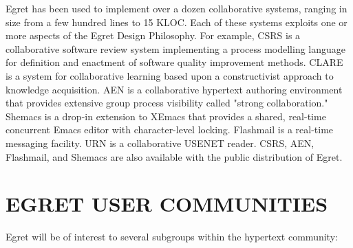 Egret has been used to implement over a dozen collaborative systems,
ranging in size from a few hundred lines to 15 KLOC.  Each of these systems
exploits one or more aspects of the Egret Design Philosophy. For example,
CSRS is a collaborative software review system implementing a process
modelling language for definition and enactment of software quality
improvement methods.  CLARE is a system for collaborative learning based
upon a constructivist approach to knowledge acquisition. AEN is a
collaborative hypertext authoring environment that provides extensive group
process visibility called "strong collaboration."  Shemacs is a drop-in
extension to XEmacs that provides a shared, real-time concurrent Emacs
editor with character-level locking. Flashmail is a real-time messaging
facility.  URN is a collaborative USENET reader.  CSRS, AEN, Flashmail, and
Shemacs are also available with the public distribution of Egret.

\section{EGRET USER COMMUNITIES}

Egret will be of interest to several subgroups within the hypertext community:

